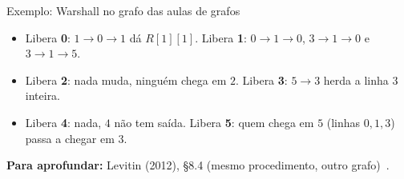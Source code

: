 \documentclass[aspectratio=169,xcolor=table]{beamer}
\newcommand{\matriz}[2]{%
  \foreach \r [count=\j from 0] in #1 {
    \node[font=\tiny\bfseries, gray!60!black] at ({\j*0.4},0.3) {\r};
    \node[font=\tiny\bfseries, gray!60!black] at (-0.36,{-\j*0.32}) {\r};
  }
  \foreach \lin [count=\i from 0] in #2
    \foreach \v [count=\j from 0] in \lin
      \node[cel] at ({\j*0.4},{-\i*0.32}) {\v};%
}
\newcommand{\marca}[3]{\fill[#3] ({#2*0.4-0.2},{-#1*0.32-0.16}) rectangle +(0.4,0.32);}
\newcommand{\titmat}[2]{\node[font=\scriptsize] at ({#1*0.2-0.2},0.72) {#2};}
\newcommand{\rotF}{0,1,2,3,4,5}
\newcommand{\Rzero}{{0,1,0,0,0,1},{1,0,0,0,0,1},{0,0,0,0,1,0},{0,1,0,0,0,0},%
  {0,0,0,0,0,0},{0,0,0,1,0,0}}
\newcommand{\Rdois}{{1,1,0,0,0,1},{1,1,0,0,0,1},{0,0,0,0,1,0},{1,1,0,0,0,1},%
  {0,0,0,0,0,0},{0,0,0,1,0,0}}
\newcommand{\Rquatro}{{1,1,0,0,0,1},{1,1,0,0,0,1},{0,0,0,0,1,0},{1,1,0,0,0,1},%
  {0,0,0,0,0,0},{1,1,0,1,0,1}}
\newcommand{\Rseis}{{1,1,0,1,0,1},{1,1,0,1,0,1},{0,0,0,0,1,0},{1,1,0,1,0,1},%
  {0,0,0,0,0,0},{1,1,0,1,0,1}}
\newcommand{\fonte}[1]{%
  \vfill
  {\tiny\color{gray!55!black}\textbf{Para aprofundar:} #1\par}%
}
\begin{document}
\begin{frame}{Exemplo: Warshall no grafo das aulas de grafos}
  \begin{center}
  \end{center}
  \begin{itemize}\scriptsize
    \item Libera \textbf{0}: $1 \to 0 \to 1$ dá $R[1][1]$. Libera \textbf{1}: $0\to1\to0$,
          $3 \to 1 \to 0$ e $3 \to 1 \to 5$.
    \item Libera \textbf{2}: nada muda, ninguém chega em $2$. Libera \textbf{3}:
          $5 \to 3$ herda a linha $3$ inteira.
    \item Libera \textbf{4}: nada, $4$ não tem saída. Libera \textbf{5}: quem chega em $5$
          (linhas $0,1,3$) passa a chegar em $3$.
  \end{itemize}
  \fonte{Levitin (2012), \S 8.4 (mesmo procedimento, outro
    grafo)~\cite{levitin2012introduction}.}
\end{frame}
\end{document}
